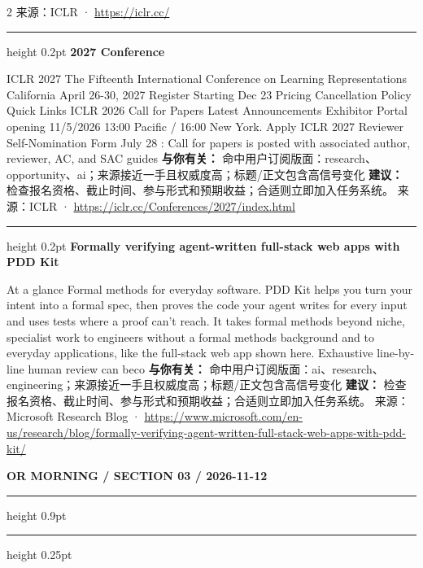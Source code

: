 \documentclass[10.5pt]{ctexart}
\begin{document}
\begin{multicols}{2}
{\footnotesize\color{ormuted} 来源：ICLR · \url{https://iclr.cc/}}
\vspace{2mm}
\hrule height 0.2pt
\vspace{2mm}
{\large\bfseries 2027 Conference}\par
ICLR 2027 The Fifteenth International Conference on Learning Representations California April 26-30, 2027 Register Starting Dec 23 Pricing Cancellation Policy Quick Links ICLR 2026 Call for Papers Latest Announcements Exhibitor Portal opening 11/5/2026 13:00 Pacific / 16:00 New York. Apply ICLR 2027 Reviewer Self-Nomination Form July 28 : Call for papers is posted with associated author, reviewer, AC, and SAC guides 
\textbf{与你有关：} 命中用户订阅版面：research、opportunity、ai；来源接近一手且权威度高；标题/正文包含高信号变化
\textbf{建议：} 检查报名资格、截止时间、参与形式和预期收益；合适则立即加入任务系统。
{\footnotesize\color{ormuted} 来源：ICLR · \url{https://iclr.cc/Conferences/2027/index.html}}
\vspace{2mm}
\hrule height 0.2pt
\vspace{2mm}
{\large\bfseries Formally verifying agent-written full-stack web apps with PDD Kit}\par
At a glance Formal methods for everyday software. PDD Kit helps you turn your intent into a formal spec, then proves the code your agent writes for every input and uses tests where a proof can’t reach. It takes formal methods beyond niche, specialist work to engineers without a formal methods background and to everyday applications, like the full-stack web app shown here. Exhaustive line-by-line human review can beco
\textbf{与你有关：} 命中用户订阅版面：ai、research、engineering；来源接近一手且权威度高；标题/正文包含高信号变化
\textbf{建议：} 检查报名资格、截止时间、参与形式和预期收益；合适则立即加入任务系统。
{\footnotesize\color{ormuted} 来源：Microsoft Research Blog · \url{https://www.microsoft.com/en-us/research/blog/formally-verifying-agent-written-full-stack-web-apps-with-pdd-kit/}}
\end{multicols}
\newpage
{\small\bfseries OR MORNING / SECTION 03 / 2026-11-12}
\vspace{2mm}
\hrule height 0.9pt
\vspace{1.5mm}
\hrule height 0.25pt
\vspace{4mm}
\end{document}
